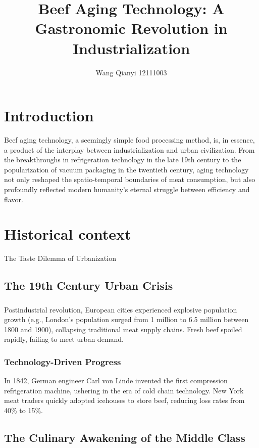 \documentclass[lettersize,journal]{IEEEtran}
\title{Beef Aging Technology: A Gastronomic Revolution in Industrialization}
\author{Wang Qianyi      12111003}
\begin{document}
  \maketitle

\section{Introduction}

Beef aging technology, a seemingly simple food processing method, is, in essence, a product of the interplay between industrialization and urban civilization. From the breakthroughs in refrigeration technology in the late 19th century to the popularization of vacuum packaging in the twentieth century, aging technology not only reshaped the spatio-temporal boundaries of meat consumption, but also profoundly reflected modern humanity's eternal struggle between efficiency and flavor.

\section{Historical context}

The Taste Dilemma of Urbanization

\subsection{The 19th Century Urban Crisis}

\subsubsection{}

Postindustrial revolution, European cities experienced explosive population growth (e.g., London's population surged from 1 million to 6.5 million between 1800 and 1900), collapsing traditional meat supply chains. Fresh beef spoiled rapidly, failing to meet urban demand.

\subsubsection{Technology-Driven Progress}

In 1842, German engineer Carl von Linde invented the first compression refrigeration machine, ushering in the era of cold chain technology. New York meat traders quickly adopted icehouses to store beef, reducing loss rates from 40\% to 15\%.

\subsection{The Culinary Awakening of the Middle Class}
\end{document}
